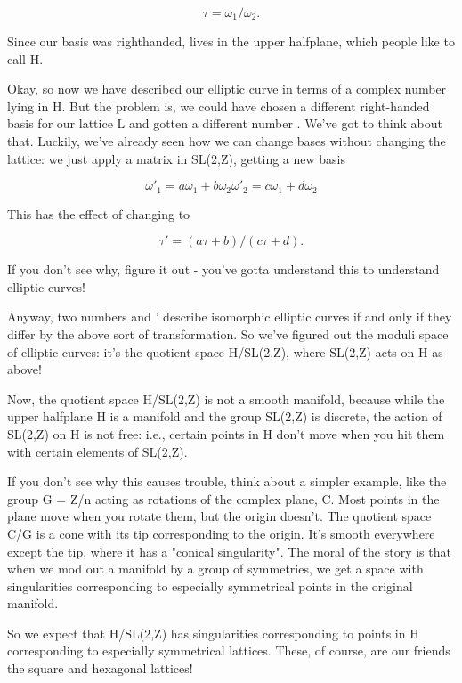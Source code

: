 $$

                       \tau  = \omega _{1}/\omega _{2}.
$$
    
Since our basis was righthanded, \tau  lives in the upper halfplane, 
which people like to call H.  

Okay, so now we have described our elliptic curve in terms of a
complex number \tau  lying in H.  But the problem is, we could have
chosen a different right-handed basis for our lattice L and gotten a
different number \tau .  We've got to think about that.  Luckily, we've
already seen how we can change bases without changing the lattice: we
just apply a matrix in SL(2,Z), getting a new basis


$$

                 \omega '_{1} = a \omega _{1} + b \omega _{2}

                 \omega '_{2} = c \omega _{1} + d \omega _{2}
$$
    
This has the effect of changing \tau  to 

$$

                \tau ' = (a \tau  + b)/(c \tau  + d).
$$
    
If you don't see why, figure it out - you've gotta understand this to
understand elliptic curves!    

Anyway, two numbers \tau  and \tau ' describe isomorphic elliptic curves
if and only if they differ by the above sort of transformation.  So
we've figured out the moduli space of elliptic curves: it's the
quotient space H/SL(2,Z), where SL(2,Z) acts on H as above!

Now, the quotient space H/SL(2,Z) is not a smooth manifold, because
while the upper halfplane H is a manifold and the group SL(2,Z) is
discrete, the action of SL(2,Z) on H is not free: i.e., certain points
in H don't move when you hit them with certain elements of SL(2,Z).

If you don't see why this causes trouble, think about a simpler
example, like the group G = Z/n acting as rotations of the complex
plane, C.  Most points in the plane move when you rotate them, but the
origin doesn't.  The quotient space C/G is a cone with its tip
corresponding to the origin.  It's smooth everywhere except the tip,
where it has a "conical singularity".  The moral of the story is that
when we mod out a manifold by a group of symmetries, we get a space
with singularities corresponding to especially symmetrical points in
the original manifold.

So we expect that H/SL(2,Z) has singularities corresponding to points in
H corresponding to especially symmetrical lattices.   These, of course,
are our friends the square and hexagonal lattices!

